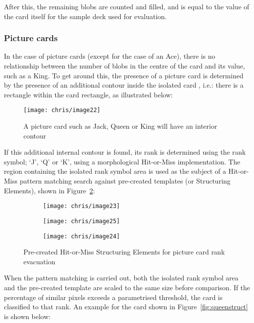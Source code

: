			After this, the remaining blobs are counted and filled, and is equal to the value of the card itself for the sample deck used for evaluation.

		\subsubsection{Picture cards}
			In the case of picture cards (except for the case of an Ace), there is no relationship between the number of blobs in the centre of the card and its value, such as a King. To get around this, the presence of a picture card is determined by the presence of an additional contour inside the isolated card , i.e.: there is a rectangle within the card rectangle, as illustrated below:

			\begin{figure}[H]
				\centering
				\texttt{[image: chris/image22]}
				\caption{A picture card such as Jack, Queen or King will have an interior contour}
				\label{fig:innercont}
			\end{figure}

			If this additional internal contour is found, its rank is determined using the rank symbol; `J', `Q' or `K', using a morphological Hit-or-Miss implementation. The region containing the isolated rank symbol area is used as the subject of a Hit-or-Miss pattern matching search against pre-created templates (or Structuring Elements), shown in Figure~\ref{fig:picstruct}:

			\begin{figure}[H]
				\centering
				\begin{subfigure}[b]{0.14\textwidth}
					\centering
					\texttt{[image: chris/image23]}
					\caption{}
				\end{subfigure}
				\begin{subfigure}[b]{0.14\textwidth}
					\centering
					\texttt{[image: chris/image25]}
					\caption{}
				\end{subfigure}
				\begin{subfigure}[b]{0.15\textwidth}
					\centering
					\texttt{[image: chris/image24]}
					\caption{}
				\end{subfigure}
				\caption{Pre-created Hit-or-Miss Structuring Elements for picture card rank evacuation}
				\label{fig:picstruct}
			\end{figure}

			When the pattern matching is carried out, both the isolated rank symbol area and the pre-created template are scaled to the same size before comparison. If the percentage of similar pixels exceeds a parametrised threshold, the card is classified to that rank. An example for the card shown in Figure~\ref{fig:queenstruct} is shown below:

